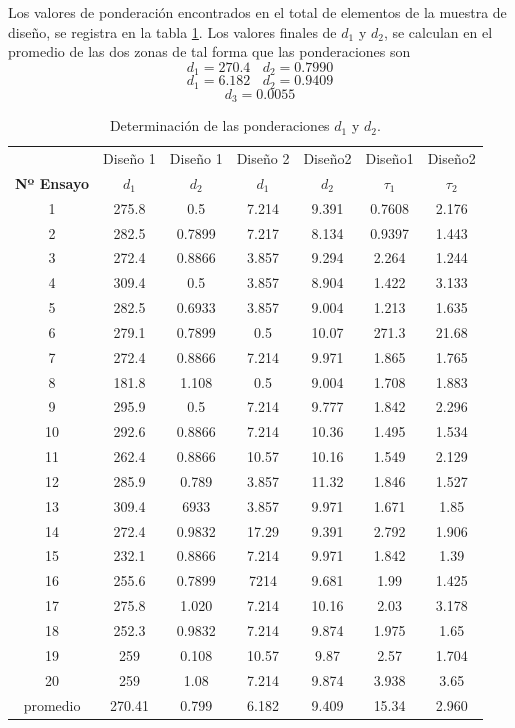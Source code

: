 \documentclass[10pt]{report}
\numberwithin{equation}{chapter}
\numberwithin{algorithm}{chapter}
\begin{document}
Los valores de ponderación encontrados en el total de elementos de la muestra de diseño, se registra en la tabla \ref{ooekf_tb1}. Los valores finales de $d_1$ y $d_2$, se calculan en el promedio de las dos zonas de tal forma que las ponderaciones son $$d_1=270.4~~~~d_2=0.7990$$ $$d_1=6.182~~~~d_2=0.9409$$ $$d_3=0.0055$$\par
\begin{table}[t]
\begin{center}
\begin{scriptsize}
\begin{tabular}{ccccccc} \hline
&Diseño 1&Diseño 1&Diseño 2 &Diseño2&Diseño1&Diseño2\\
\textbf{Nº Ensayo}&\textbf{$d_1$}&\textbf{$d_2$}&\textbf{$d_1$}& \textbf{$d_2$}&\textbf{$\tau_1$}&\textbf{$\tau_2$}\\ \hline
1&275.8&0.5&7.214&9.391&0.7608&2.176\\ 
2&282.5&0.7899&7.217&8.134&0.9397&1.443\\ 
3&272.4&0.8866&3.857&9.294&2.264&1.244\\
4&309.4&0.5&3.857&8.904&1.422&3.133\\
5&282.5&0.6933&3.857&9.004&1.213&1.635\\
6&279.1&0.7899&0.5&10.07&271.3&21.68\\
7&272.4&0.8866&7.214&9.971&1.865&1.765\\
8&181.8&1.108&0.5&9.004&1.708&1.883\\
9&295.9&0.5&7.214&9.777&1.842&2.296\\
10&292.6&0.8866&7.214&10.36&1.495&1.534\\
11&262.4&0.8866&10.57&10.16&1.549&2.129\\
12&285.9&0.789&3.857&11.32&1.846&1.527\\
13&309.4&6933&3.857&9.971&1.671&1.85\\
14&272.4&0.9832&17.29&9.391&2.792&1.906\\
15&232.1&0.8866&7.214&9.971&1.842&1.39\\
16&255.6&0.7899&7214&9.681&1.99&1.425\\
17&275.8&1.020&7.214&10.16&2.03&3.178\\
18&252.3&0.9832&7.214&9.874&1.975&1.65\\
19&259&0.108&10.57&9.87&2.57&1.704\\
20&259&1.08&7.214&9.874&3.938&3.65\\\hline
promedio&270.41&0.799&6.182&9.409&15.34&2.960
\end{tabular}
\end{scriptsize}
\caption{Determinación de las ponderaciones $d_1$ y $d_2$.} 
\label{ooekf_tb1}
\end{center}
\end{table} 
\end{document}
